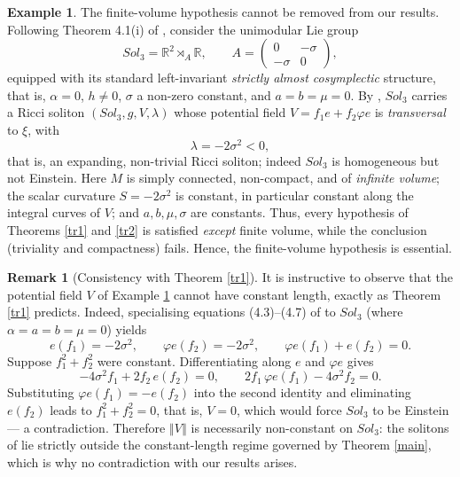 \documentclass[a4paper, twoside, 10pt]{article}
\numberwithin{equation}{section}
\theoremstyle{definition}
\newtheorem{example}{Example}[section]
\newtheorem{remark}{Remark}[section]
\begin{document}
\begin{example}\label{ex:sol3}
The finite-volume hypothesis cannot be removed from our results.
Following Theorem 4.1(i) of \cite{li2022ricci}, consider the
unimodular Lie group
\[
Sol_{3}=\mathbb{R}^{2}\rtimes_{A}\mathbb{R},
\qquad
A=\begin{pmatrix} 0 & -\sigma\\ -\sigma & 0\end{pmatrix},
\]
equipped with its standard left-invariant \emph{strictly almost
cosymplectic} structure, that is, $\alpha=0$, $h\neq 0$, $\sigma$ a
non-zero constant, and $a=b=\mu=0$. By \cite{li2022ricci}, $Sol_{3}$
carries a Ricci soliton $\left(Sol_{3},g,V,\lambda\right)$ whose
potential field $V=f_{1}e+f_{2}\varphi e$ is \emph{transversal} to
$\xi$, with
\[
\lambda=-2\sigma^{2}<0,
\]
that is, an expanding, non-trivial Ricci soliton; indeed $Sol_{3}$ is
homogeneous but not Einstein. Here $M$ is simply connected,
non-compact, and of \emph{infinite volume}; the scalar curvature
$S=-2\sigma^{2}$ is constant, in particular constant along the
integral curves of $V$; and $a,b,\mu,\sigma$ are constants. Thus,
every hypothesis of Theorems \ref{tr1} and \ref{tr2} is satisfied
\emph{except} finite volume, while the conclusion (triviality and
compactness) fails. Hence, the finite-volume hypothesis is essential.
\end{example}

\begin{remark}[Consistency with Theorem \ref{tr1}]\label{rem:consistency}
It is instructive to observe that the potential field $V$ of Example
\ref{ex:sol3} cannot have constant length, exactly as Theorem
\ref{tr1} predicts. Indeed, specialising equations (4.3)--(4.7) of
\cite{li2022ricci} to $Sol_{3}$ (where $\alpha=a=b=\mu=0$) yields
\[
e(f_{1})=-2\sigma^{2},\qquad
\varphi e(f_{2})=-2\sigma^{2},\qquad
\varphi e(f_{1})+e(f_{2})=0 .
\]
Suppose $f_{1}^{2}+f_{2}^{2}$ were constant. Differentiating along $e$
and $\varphi e$ gives
\[
-4\sigma^{2}f_{1}+2f_{2}\,e(f_{2})=0,
\qquad
2f_{1}\,\varphi e(f_{1})-4\sigma^{2}f_{2}=0 .
\]
Substituting $\varphi e(f_{1})=-e(f_{2})$ into the second identity and
eliminating $e(f_{2})$ leads to $f_{1}^{2}+f_{2}^{2}=0$, that is,
$V=0$, which would force $Sol_{3}$ to be Einstein --- a contradiction.
Therefore $\left\Vert V\right\Vert$ is necessarily non-constant on
$Sol_{3}$: the solitons of \cite{li2022ricci} lie strictly outside the
constant-length regime governed by Theorem \ref{main}, which is why no
contradiction with our results arises.
\end{remark}
\end{document}
